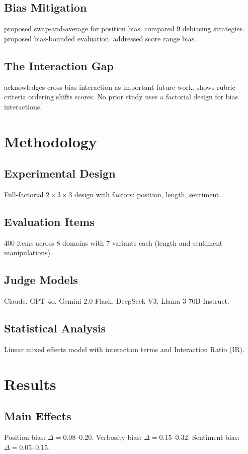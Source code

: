 \documentclass[11pt]{article}
\begin{document}
\subsection{Bias Mitigation}
\citet{zheng2023judging} proposed swap-and-average for position bias. \citet{soumik2026judging} compared 9 debiasing strategies. \citet{feuer2026provably} proposed bias-bounded evaluation. \citet{fujinuma2026contrastive} addressed score range bias.

\subsection{The Interaction Gap}
\citet{soumik2026judging} acknowledges cross-bias interaction as important future work. \citet{xu2026pointwise} shows rubric criteria ordering shifts scores. No prior study uses a factorial design for bias interactions.

\section{Methodology}
\subsection{Experimental Design}
Full-factorial $2 \times 3 \times 3$ design with factors: position, length, sentiment.

\subsection{Evaluation Items}
400 items across 8 domains with 7 variants each (length and sentiment manipulations).

\subsection{Judge Models}
Claude, GPT-4o, Gemini 2.0 Flash, DeepSeek V3, Llama 3 70B Instruct.

\subsection{Statistical Analysis}
Linear mixed effects model with interaction terms and Interaction Ratio (IR).

\section{Results}
\subsection{Main Effects}
Position bias: $\Delta = 0.08$--0.20. Verbosity bias: $\Delta = 0.15$--0.32. Sentiment bias: $\Delta = 0.05$--0.15.
\end{document}
